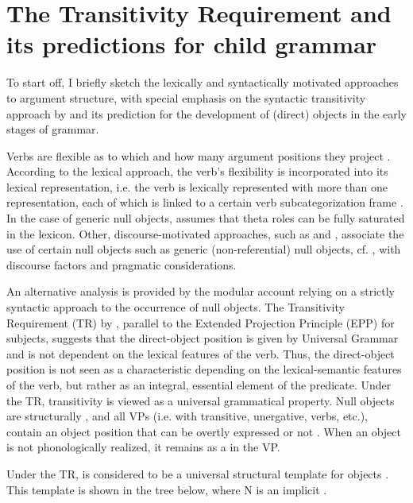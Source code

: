 \documentclass[output=paper,modfonts,newtxmath,hidelinks,]{langscibook}
\begin{document}
\section{The Transitivity Requirement and its predictions for child grammar}\label{17:sec:key:2}

To start off, I briefly sketch the lexically and syntactically motivated approaches to argument structure, with special emphasis on the syntactic transitivity approach by \citet{Cummins-Roberge2005} and its prediction for the development of (direct) objects in the early stages of grammar.

Verbs are flexible as to which and how many argument positions they project \citep[25]{VanHout2012}. According to the lexical approach, the verb’s flexibility is incorporated into its lexical representation, i.e. the verb is lexically represented with more than one representation, each of which is linked to a certain verb subcategorization frame \citep{Chomsky1965,Emonds1991}. In the case of  generic null objects, \citet{Rizzi1986} assumes that theta roles can be fully saturated in the lexicon. Other, discourse-motivated approaches, such as \citet{Groefsema1995} and \citet{Fellbaum-Kegl1989}, associate the use of certain null objects such as generic (non-referential) null objects, cf. , with discourse factors and pragmatic considerations.

An alternative analysis is provided by the modular account relying on a strictly syntactic approach to the occurrence of null objects. The Transitivity Requirement (TR) by \citet{Cummins-Roberge2005}, parallel to the Extended Projection Principle (EPP) for subjects, suggests that the direct-object position is given by Universal Grammar and is not dependent on the lexical features of the verb. Thus, the direct-object position is not seen as a characteristic depending on the lexical-semantic features of the verb, but rather as an integral, essential element of the predicate. Under the TR, transitivity is viewed as a universal grammatical property. Null objects are structurally , and all VPs (i.e. with transitive, unergative,  verbs, etc.), contain an object position that can be overtly expressed or not \citep{Cummins-Roberge2005}. When an object is not phonologically realized, it remains as a  in the VP.

Under the TR,  is considered to be a universal structural template for objects \citep{Cummins-Roberge2005,Perez-Leroux-etal2008}. This template is shown in the tree below, where N is an implicit .
\end{document}

